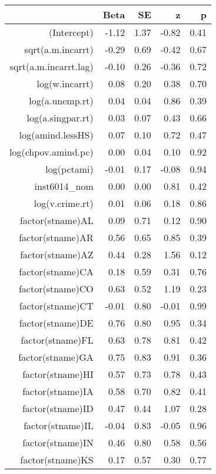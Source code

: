\begin{table}[ht]
\centering
\begin{tabular}{rrrrr}
  \hline
 & Beta & SE & z & p \\ 
  \hline
(Intercept) & -1.12 & 1.37 & -0.82 & 0.41 \\ 
  sqrt(a.m.incarrt) & -0.29 & 0.69 & -0.42 & 0.67 \\ 
  sqrt(a.m.incarrt.lag) & -0.10 & 0.26 & -0.36 & 0.72 \\ 
  log(w.incarrt) & 0.08 & 0.20 & 0.38 & 0.70 \\ 
  log(a.unemp.rt) & 0.04 & 0.04 & 0.86 & 0.39 \\ 
  log(a.singpar.rt) & 0.03 & 0.07 & 0.43 & 0.66 \\ 
  log(amind.lessHS) & 0.07 & 0.10 & 0.72 & 0.47 \\ 
  log(chpov.amind.pc) & 0.00 & 0.04 & 0.10 & 0.92 \\ 
  log(pctami) & -0.01 & 0.17 & -0.08 & 0.94 \\ 
  inst6014\_nom & 0.00 & 0.00 & 0.81 & 0.42 \\ 
  log(v.crime.rt) & 0.01 & 0.06 & 0.18 & 0.86 \\ 
  factor(stname)AL & 0.09 & 0.71 & 0.12 & 0.90 \\ 
  factor(stname)AR & 0.56 & 0.65 & 0.85 & 0.39 \\ 
  factor(stname)AZ & 0.44 & 0.28 & 1.56 & 0.12 \\ 
  factor(stname)CA & 0.18 & 0.59 & 0.31 & 0.76 \\ 
  factor(stname)CO & 0.63 & 0.52 & 1.19 & 0.23 \\ 
  factor(stname)CT & -0.01 & 0.80 & -0.01 & 0.99 \\ 
  factor(stname)DE & 0.76 & 0.80 & 0.95 & 0.34 \\ 
  factor(stname)FL & 0.63 & 0.78 & 0.81 & 0.42 \\ 
  factor(stname)GA & 0.75 & 0.83 & 0.91 & 0.36 \\ 
  factor(stname)HI & 0.57 & 0.73 & 0.78 & 0.43 \\ 
  factor(stname)IA & 0.58 & 0.70 & 0.82 & 0.41 \\ 
  factor(stname)ID & 0.47 & 0.44 & 1.07 & 0.28 \\ 
  factor(stname)IL & -0.04 & 0.83 & -0.05 & 0.96 \\ 
  factor(stname)IN & 0.46 & 0.80 & 0.58 & 0.56 \\ 
  factor(stname)KS & 0.17 & 0.57 & 0.30 & 0.77 \\ 

\end{tabular}
\end{table}
